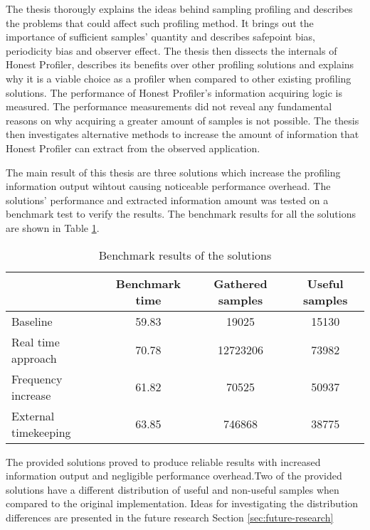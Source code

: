 \documentclass[..thesis.tex]{subfiles}
\begin{document}
The thesis thorougly explains the ideas behind sampling profiling and describes the problems that could affect such profiling method. It brings out the importance of sufficient samples' quantity and describes safepoint bias, periodicity bias and observer effect. The thesis then dissects the internals of Honest Profiler, describes its benefits over other profiling solutions and explains why it is a viable choice as a profiler when compared to other existing profiling solutions. The performance of Honest Profiler's information acquiring logic is measured. The performance measurements did not reveal any fundamental reasons on why acquiring a greater amount of samples is not possible. The thesis then investigates alternative methods to increase the amount of information that Honest Profiler can extract from the observed application.


The main result of this thesis are three solutions which increase the profiling information output wihtout causing noticeable performance overhead. The solutions' performance and extracted information amount was tested on a benchmark test to verify the results. The benchmark results for all the solutions are shown in Table \ref{table:results}.

\begin{table}[h]
\centering
\caption{Benchmark results of the solutions}
\label{table:results}

\begin{tabular}{l | c | c | c}
 & Benchmark time  & Gathered samples&  Useful samples  \\
 \hline
Baseline & 59.83 & 19025 & 15130  \\
Real time approach & 70.78 & 12723206 & 73982 \\
Frequency increase & 61.82 & 70525 & 50937  \\
External timekeeping & 63.85 & 746868 & 38775 
\end{tabular}
\end{table}

The provided solutions proved to produce reliable results with increased information output and negligible performance overhead.Two of the provided solutions have a different distribution of useful and non-useful samples when compared to the original implementation. Ideas for investigating the distribution differences are presented in the future research Section \ref{sec:future-research}
\end{document}
